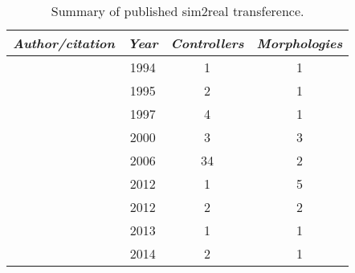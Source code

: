 
\begin{table}[t]
\footnotesize
\caption{\label{table:lit_review}Summary of published sim2real transference.}
\vspace{-1.25em}
\begin{center}
\begin{tabular}{lccc} 
    \toprule
    \textit{Author/citation} & \textit{Year} & \textit{Controllers} & \textit{Morphologies} \\ 
    \midrule
    
    \citet{Miglino1994Selection}    & 1994 & 1 & 1 \\  %
    \citet{jakobi1995noise}         & 1995 & 2 & 1 \\  %
    
    
    \citet{HARVEY1997205}           & 1997 & 4 & 1 \\  %
    
    \citet{lipson2000automatic}     & 2000 & 3 & 3 \\
    
    \citet{bongard2006resilient}    & 2006 & 34 & 2 \\
    
    \citet{hiller2012automatic}     & 2012 & 1 & 5 \\ 
    
    \citet{koos2012transferability} & 2012 & 2 & 2 \\ 
    
    \citet{moeckel2013gait}         & 2013 & 1 & 1 \\  %
    
    \citet{caluwaerts2014design}    & 2014 & 2 & 1 \\ %
    

\end{tabular}
\end{center}
\end{table}

